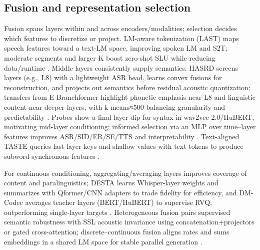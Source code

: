 \documentclass{article}
\begin{document}
\subsection{Fusion and representation selection} \label{subsec:Fusion and representation selection}
Fusion spans layers within and across encoders/modalities; selection decides which features to discretize or project. LM-aware tokenization (LAST) maps speech features toward a text-LM space, improving spoken LM and S2T; moderate segments and larger K boost zero-shot SLU while reducing data/runtime \cite{turetzky2024lastlanguagemodelawarespeechtokenization,kando2025exploringeffectsegmentationvocabularysiz}. Middle layers consistently supply semantics: HASRD screens layers (e.g., L8) with a lightweight ASR head, learns convex fusions for reconstruction, and projects out semantics before residual acoustic quantization; transfers from E-Branchformer highlight phonetic emphasis near L8 and linguistic content near deeper layers, with k-means≈500 balancing granularity and predictability \cite{hussein2025hasrdhierarchicalacousticsemanticreprese,chen2023reducingbarriersselfsupervisedlearninghu}. Probes show a final-layer dip for syntax in wav2vec 2.0/HuBERT, motivating mid-layer conditioning; informed selection via an MLP over time–layer features improves ASR/SID/ER/SE/TTS and interpretability \cite{shen2023wavesyntaxprobingspokenlanguagemodels,mousavi2024howshouldweextractdiscreteaudiotokenssel}. Text-aligned TASTE queries last-layer keys and shallow values with text tokens to produce subword-synchronous features \cite{tseng2025tastetextalignedspeechtokenizationembedd}.

For continuous conditioning, aggregating/averaging layers improves coverage of content and paralinguistics; DESTA learns Whisper-layer weights and summarizes with Qformer/CNN adapters to trade fidelity for efficiency, and DM-Codec averages teacher layers (BERT/HuBERT) to supervise RVQ, outperforming single-layer targets \cite{lu2024destaenhancingspeechlanguagemodelsthroug,ahasan2025dmcodecdistillingmultimodalrepresentatio}. Heterogeneous fusion pairs supervised semantic robustness with SSL acoustic invariance using concatenation+projectors or gated cross-attention; discrete–continuous fusion aligns rates and sums embeddings in a shared LM space for stable parallel generation \cite{mei2025shnumultilingualconversationalspeechreco,lin2025dkusystemmultispeakerautomaticspeechreco,tan2025drvoiceparallelspeechtextvoiceconversati}.
\end{document}
